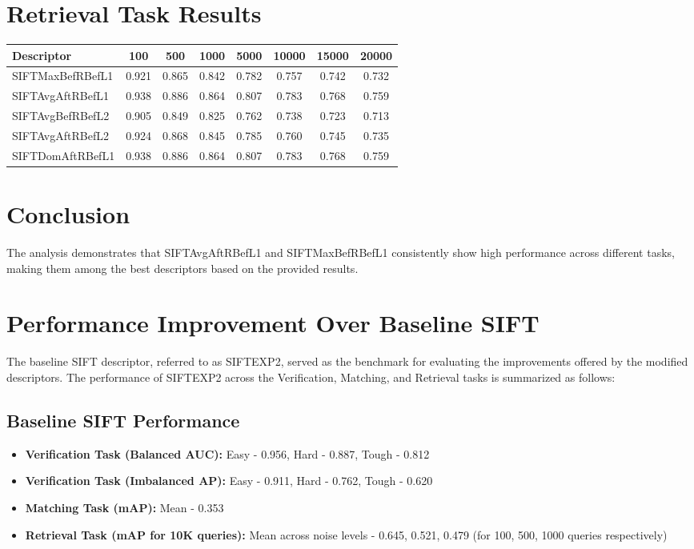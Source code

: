 \section*{Retrieval Task Results}

\begin{tabularx}{\textwidth}{Xccccccc}
\toprule
\textbf{Descriptor} & \textbf{100} & \textbf{500} & \textbf{1000} & \textbf{5000} & \textbf{10000} & \textbf{15000} & \textbf{20000} \\
\midrule
SIFTMaxBefRBefL1 & 0.921 & 0.865 & 0.842 & 0.782 & 0.757 & 0.742 & 0.732 \\
SIFTAvgAftRBefL1 & 0.938 & 0.886 & 0.864 & 0.807 & 0.783 & 0.768 & 0.759 \\
SIFTAvgBefRBefL2 & 0.905 & 0.849 & 0.825 & 0.762 & 0.738 & 0.723 & 0.713 \\
SIFTAvgAftRBefL2 & 0.924 & 0.868 & 0.845 & 0.785 & 0.760 & 0.745 & 0.735 \\
SIFTDomAftRBefL1 & 0.938 & 0.886 & 0.864 & 0.807 & 0.783 & 0.768 & 0.759 \\
\bottomrule
\end{tabularx}

\section*{Conclusion}

The analysis demonstrates that SIFTAvgAftRBefL1 and SIFTMaxBefRBefL1 consistently show high performance across different tasks, making them among the best descriptors based on the provided results.

\section*{Performance Improvement Over Baseline SIFT}

The baseline SIFT descriptor, referred to as SIFTEXP2, served as the benchmark for evaluating the improvements offered by the modified descriptors. The performance of SIFTEXP2 across the Verification, Matching, and Retrieval tasks is summarized as follows:

\subsection*{Baseline SIFT Performance}

\begin{itemize}
    \item \textbf{Verification Task (Balanced AUC):} Easy - 0.956, Hard - 0.887, Tough - 0.812
    \item \textbf{Verification Task (Imbalanced AP):} Easy - 0.911, Hard - 0.762, Tough - 0.620
    \item \textbf{Matching Task (mAP):} Mean - 0.353
    \item \textbf{Retrieval Task (mAP for 10K queries):} Mean across noise levels - 0.645, 0.521, 0.479 (for 100, 500, 1000 queries respectively)
\end{itemize}

